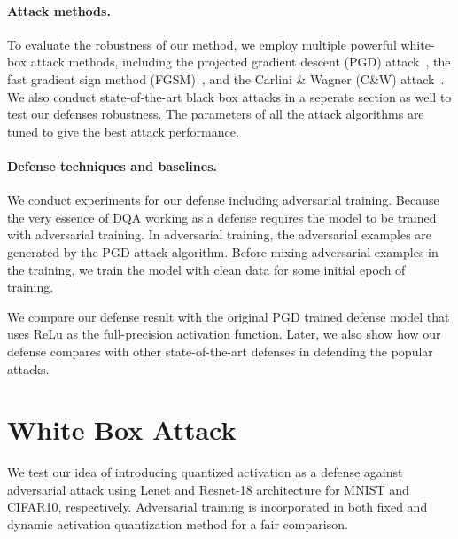 \documentclass{article}
\begin{document}
\paragraph{Attack methods.}
To evaluate the robustness of our method, we employ multiple powerful white-box attack methods, including the projected gradient descent (PGD) attack~\cite{madry2017towards}, the fast gradient sign method (FGSM)~\cite{goodfellow2014explaining}, and the Carlini \& Wagner (C\&W) attack~\cite{carlini2017towards}. We also conduct state-of-the-art black box attacks  in a seperate section as well \cite{papernot2017practical,chen2017zoo} to test our defenses robustness. The parameters of all the attack algorithms are tuned to give the best attack performance.

\paragraph{Defense techniques and baselines.}
We conduct experiments for our defense including adversarial training. Because the very essence of DQA working as a defense requires the model to be trained with adversarial training. In adversarial training, the adversarial examples are generated by the PGD attack algorithm. Before mixing adversarial examples in the training, we train the model with clean data for some initial epoch of training. 

We compare our defense result with the original PGD trained defense model \cite{madry2017towards} that uses ReLu as the full-precision activation function. Later, we also show how our defense compares with other state-of-the-art defenses in defending the popular attacks.

\section{White Box Attack}
We test our idea of introducing quantized activation as a defense against adversarial attack using Lenet and Resnet-18 architecture for MNIST and CIFAR10, respectively. Adversarial training is incorporated in both fixed and dynamic activation quantization method for a fair comparison.  
\end{document}
